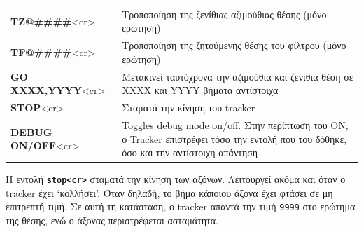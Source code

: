 \documentclass[
  a4paper,
  twoside,
  titlepage,
  11pt]{article}
\numberwithin{equation}{section}
\numberwithin{figure}{section}
\numberwithin{table}{section}
\begin{document}
\begin{longtable}[]{@{}
  >{\raggedleft\arraybackslash}p{}
  >{\raggedright\arraybackslash}p{}@{}}
\textbf{TZ@\#\#\#\#}\textless cr\textgreater{} & Τροποποίηση της ζενίθιας αζιμούθιας θέσης (μόνο ερώτηση) \\
\textbf{TF@\#\#\#\#}\textless cr\textgreater{} & Τροποποίηση της ζητούμενης θέσης του φίλτρου (μόνο ερώτηση) \\
\textbf{GO XXXX,YYYY}\textless cr\textgreater{} & Μετακινεί ταυτόχρονα την αζιμούθια και ζενίθια θέση σε XXXX και YYYY βήματα αντίστοιχα \\
\textbf{STOP}\textless cr\textgreater{} & Σταματά την κίνηση του tracker \\
\textbf{DEBUG ON/OFF}\textless cr\textgreater{} & Toggles debug mode on/off. Στην περίπτωση του ON, ο Tracker επιστρέφει τόσο την εντολή που του δόθηκε, όσο και την αντίστοιχη απάντηση \\
\bottomrule
\end{longtable}

\normalsize

Η εντολή \textbf{\texttt{stop\textless{}cr\textgreater{}}} σταματά την κίνηση των αξόνων. Λειτουργεί ακόμα και όταν ο tracker έχει `κολλήσει'. Όταν δηλαδή, το βήμα κάποιου άξονα έχει φτάσει σε μη επιτρεπτή τιμή. Σε αυτή τη κατάσταση, ο tracker απαντά την τιμή \texttt{9999} στο ερώτημα της θέσης, ενώ ο άξονας περιστρέφεται ασταμάτητα.

\footnotesize
\end{document}

